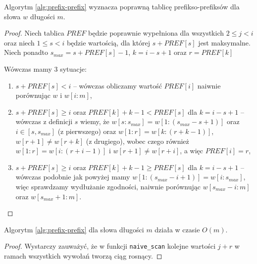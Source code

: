 \begin{code}
\inputminted{python}{code/other/prefix-prefix.py}
\label{alg:prefix-prefix}
\end{code}

\begin{theorem}{}{}
  Algorytm \ref{alg:prefix-prefix} wyznacza poprawną tablicę prefikso-prefiksów dla słowa $w$ długości $m$.
\end{theorem}

\begin{proof}
  Niech tablica $PREF$ będzie poprawnie wypełniona dla wszystkich $2 \le j < i$ oraz niech $1 \le s < i$ będzie wartością, dla której $s + PREF[s]$ jest maksymalne.
  Niech ponadto $s_{max} = s + PREF[s] - 1$, $k = i - s + 1$ oraz $r = PREF[k]$
  
  Wówczas mamy 3 sytuacje:
  \begin{enumerate}
      \item $s + PREF[s] < i$ -- wówczas obliczamy wartość $PREF[i]$ naiwnie porównując $w$ i $w[i:m]$,
      \item $s + PREF[s] \ge i$ oraz $PREF[k] + k - 1 < PREF[s]$ dla $k = i - s + 1$ -- wówczas z definicji $s$ wiemy, że $w[s:s_{max}] = w[1:(s_{max} - s + 1)]$ oraz $i \in [s, s_{max}]$ (z pierwszego) oraz $w[1:r] = w[k:(r + k - 1)]$, $w[r + 1] \neq w[r + k]$ (z drugiego), wobec czego również $w[1:r] = w[i:(r + i - 1)]$ i $w[r + 1] \neq w[r + i]$, a więc $PREF[i] = r$,
      \item $s + PREF[s] \ge i$ oraz $PREF[k] + k - 1 \ge PREF[s]$ dla $k = i - s + 1$ -- wówczas podobnie jak powyżej mamy $w[1:(s_{max} - i + 1)] = w[i:s_{max}]$, więc sprawdzamy wydłużanie zgodności, naiwnie porównując $w[s_{max} - i:m]$ oraz $w[s_{max} + 1:m]$.
  \end{enumerate}
\end{proof}

\begin{theorem}{}{}
  Algorytm \ref{alg:prefix-prefix} dla słowa długości $m$ działa w czasie $O(m)$.
\end{theorem}

\begin{proof}
  Wystarczy zauważyć, że w funkcji \texttt{naive\_scan} kolejne wartości $j + r$ w ramach wszystkich wywołań tworzą ciąg rosnący.
\end{proof}

\begin{code}
\inputminted{python}{code/other/maximum-suffixes.py}
\label{alg:maximum-suffixes}
\end{code}


